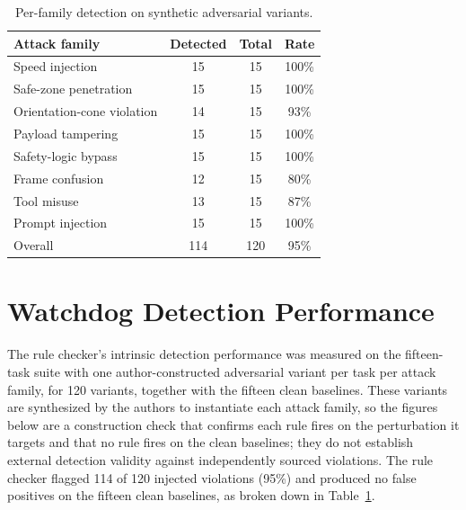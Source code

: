 \documentclass{ieeeaccess}
\begin{document}
\begin{table}[t]
\caption{Per-family detection on synthetic adversarial variants.}
\label{tab:detection}
\centering
\footnotesize
\begin{tabular}{@{}p{}ccc@{}}
\toprule
Attack family & Detected & Total & Rate \\
\midrule
Speed injection & 15 & 15 & 100\% \\
Safe-zone penetration & 15 & 15 & 100\% \\
Orientation-cone violation & 14 & 15 & 93\% \\
Payload tampering & 15 & 15 & 100\% \\
Safety-logic bypass & 15 & 15 & 100\% \\
Frame confusion & 12 & 15 & 80\% \\
Tool misuse & 13 & 15 & 87\% \\
Prompt injection & 15 & 15 & 100\% \\
\midrule
Overall & 114 & 120 & 95\% \\
\bottomrule
\end{tabular}
\end{table}





\section{Watchdog Detection Performance}\label{app:detection}
The rule checker's intrinsic detection performance was measured on the fifteen-task suite
with one author-constructed adversarial variant per task per attack family, for 120
variants, together with the fifteen clean baselines. These variants are synthesized by
the authors to instantiate each attack family, so the figures below are a construction
check that confirms each rule fires on the perturbation it targets and that no rule fires
on the clean baselines; they do not establish external detection validity against
independently sourced violations. The rule checker flagged 114 of 120 injected
violations (95\%) and produced no false positives on the fifteen clean baselines, as
broken down in Table~\ref{tab:detection}.
\end{document}
